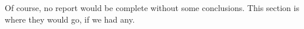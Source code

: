     Of course, no report would be complete without some conclusions.
    This section is where they would go, if we had any.
